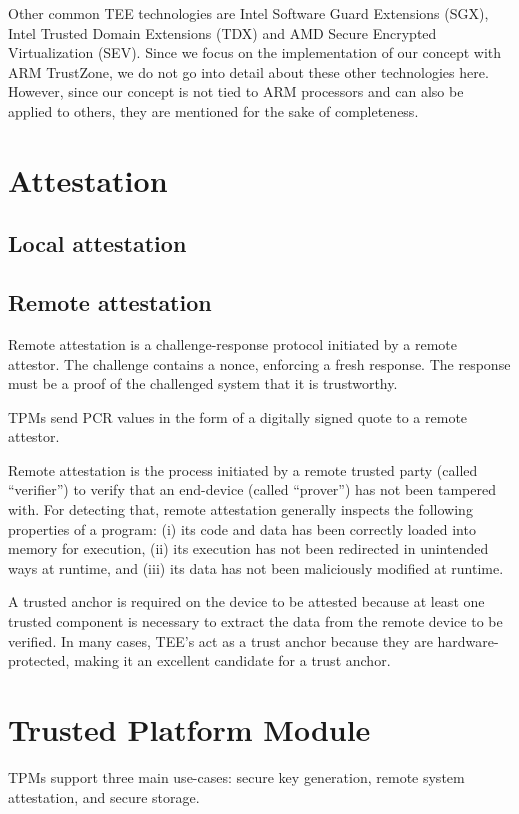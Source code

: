 Other common \ac{TEE} technologies are Intel Software Guard Extensions (SGX), Intel Trusted Domain Extensions (TDX) and AMD Secure Encrypted Virtualization (SEV). Since we focus on the implementation of our concept with ARM TrustZone, we do not go into detail about these other technologies here. However, since our concept is not tied to ARM processors and can also be applied to others, they are mentioned for the sake of completeness.

\section{Attestation}
\subsection{Local attestation}
\subsection{Remote attestation}

Remote attestation is a challenge-response protocol initiated by a remote attestor.
The challenge contains a nonce, enforcing a fresh response.
The response must be a proof of the challenged system that it is trustworthy.

TPMs send PCR values in the form of a digitally signed quote to a remote attestor.

Remote attestation is the process initiated by a remote trusted party (called ``verifier'') to verify that an end-device (called ``prover'') has not been tampered with. For detecting that, remote attestation generally inspects the following properties of a program: (i) its code and data has been correctly loaded into memory for execution, (ii) its execution has not been redirected in unintended ways at runtime, and (iii) its data has not been maliciously modified at runtime.

A trusted anchor is required on the device to be attested because at least one trusted component is necessary to extract the data from the remote device to be verified. In many cases, TEE's act as a trust anchor because they are hardware-protected, making it an excellent candidate for a trust anchor.

\section{Trusted Platform Module}

TPMs support three main use-cases: secure key generation, remote system attestation, and secure storage. 

